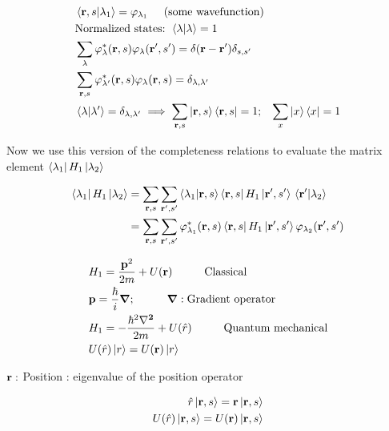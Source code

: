 \begin{align}
	&\braket{\vb{r},s}{\lambda_1} = \varphi_{\lambda_{1}} \hspace{0.5cm} \text{(some wavefunction)} \nonumber\\
	&\text{Normalized states: } \braket{\lambda}{\lambda}=1 \nonumber \\
	&\sum_\lambda \varphi_\lambda^* (\vb{r},s) \varphi_\lambda (\vb{r'},s') = \delta(\vb{r}-\vb{r'}) \delta_{s,s'}\\
	&\sum_{\vb{r},s} \varphi_{\lambda'}^* (\vb{r},s) \varphi_\lambda (\vb{r},s) = \delta_{\lambda, \lambda'}\\
	& \braket{\lambda}{\lambda'}= \delta_{\lambda, \lambda'} \implies \sum_{\vb{r},s} \ket{\vb{r},s} \bra{\vb{r},s} = 1 ; \hspace{0.3cm} \sum_x \ket{x}\bra{x}=1
\end{align}

\noindent Now we use this version of the completeness relations to evaluate the matrix element $\bra{\lambda_1} H_1 \ket{\lambda_2}$

\begin{align}
	\bra{\lambda_1} H_1 \ket{\lambda_2} &= \sum_{\vb{r},s} \sum_{\vb{r'},s'} \braket{\lambda_1}{\vb{r},s} \bra{\vb{r},s} H_1 \ket*{\vb{r'},s'} \braket*{\vb{r'}}{\lambda_2}\\
	&=  \sum_{\vb{r},s} \sum_{\vb{r'},s'} \varphi_{\lambda_1}^* (\vb{r},s)  \bra{\vb{r},s} H_1 \ket*{\vb{r'},s'} \varphi_{\lambda_2} (\vb{r'},s') \nonumber
\end{align}

\begin{align}
	&H_1 = \frac{\vb{p}^2}{2m}+ U(\vb{r}) \hspace{1cm} \text{Classical}\\
	&\vb{p}= \frac{\hbar}{i} \vb{\gradient}  ;  \hspace{1cm} \vb{\gradient}: \text{Gradient operator}\\
	&H_1 =  - \frac{\hbar^2 \vb{\laplacian}}{2m} + U(\hat{r}) \hspace{1cm} \text{Quantum mechanical}\\
	& U(\hat{r}) \ket{r} = U(\vb{r})\ket{r}
\end{align}

\noindent $\vb{r}:$ Position : eigenvalue of the position operator

\begin{align}
	\hat{r} \ket{\vb{r},s}= \vb{r} \ket{\vb{r}, s}\\
	U(\hat{r}) \ket{\vb{r},s}= U(\vb{r}) \ket{\vb{r},s}
\end{align}


